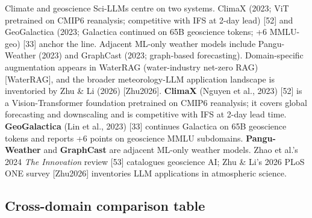 Climate and geoscience Sci-LLMs centre on two systems. ClimaX (2023; ViT pretrained on CMIP6 reanalysis; competitive with IFS at 2-day lead) {[}52{]} and GeoGalactica (2023; Galactica continued on 65B geoscience tokens; +6 MMLU-geo) {[}33{]} anchor the line. Adjacent ML-only weather models include Pangu-Weather (2023) and GraphCast (2023; graph-based forecasting). Domain-specific augmentation appears in WaterRAG (water-industry net-zero RAG) {[}WaterRAG{]}, and the broader meteorology-LLM application landscape is inventoried by Zhu \& Li (2026) {[}Zhu2026{]}. \textbf{ClimaX} (Nguyen et al., 2023) {[}52{]} is a Vision-Transformer foundation pretrained on CMIP6 reanalysis; it covers global forecasting and downscaling and is competitive with IFS at 2-day lead time. \textbf{GeoGalactica} (Lin et al., 2023) {[}33{]} continues Galactica on 65B geoscience tokens and reports +6 points on geoscience MMLU subdomains. \textbf{Pangu-Weather} and \textbf{GraphCast} are adjacent ML-only weather models. Zhao et al.'s 2024 \emph{The Innovation} review {[}53{]} catalogues geoscience AI; Zhu \& Li's 2026 PLoS ONE survey {[}Zhu2026{]} inventories LLM applications in atmospheric science.

\subsection{Cross-domain comparison table}\label{cross-domain-comparison-table}

